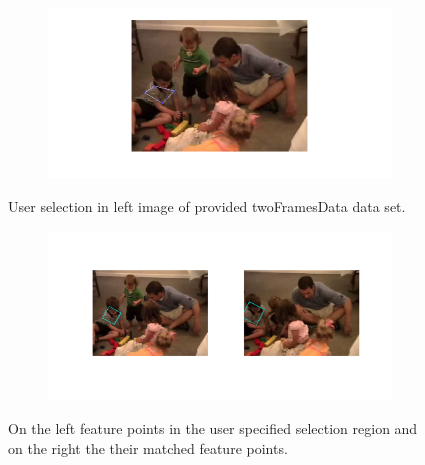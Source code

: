 \documentclass{paper}
\begin{document}
\begin{figure}[H]
\centering
\begin{subfigure}{1.0\textwidth}
\includegraphics[width=\textwidth]{figures/raw_matches/kids/selMatch1}
\end{subfigure}
\caption{User selection in left image of provided twoFramesData data set.}
\label{fig:kids_raw_sel}
\end{figure}

\begin{figure}[H]
\centering
\begin{subfigure}{1.0\textwidth}
\includegraphics[width=\textwidth]{figures/raw_matches/kids/match1}
\end{subfigure}
\caption{On the left feature points in the user specified selection region and on the right the their matched feature points.}
\label{fig:kids_raw_matching}
\end{figure}
\end{document}
